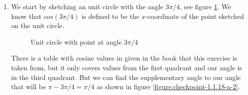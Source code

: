 \begin{enumerate}[label=(\alph*)]
  \item
    We start by sketching an unit circle with the angle $ 3\pi/4 $, see figure \ref{figure:checkpoint-1.1.18-a-1}. We know that $ cos(3\pi/4) $ is defined to be the $ x $-coordinate of the point sketched on the unit circle.

    \begin{figure}[h]
      \centering
      \caption{Unit circle with point at angle $ 3\pi/4 $}
      \label{figure:checkpoint-1.1.18-a-1}
    \end{figure}

    There is a table with cosine values in given in the book that this exercise is taken from, but it only covers values from the first quadrant and our angle is in the third quadrant. But we can find the supplementary angle to our angle that will be $ \pi - 3\pi/4 = \pi/4 $ as shown in figure \ref{figure:checkpoint-1.1.18-a-2}.

    \begin{figure}[h]
      \centering
\end{figure}
\end{enumerate}
